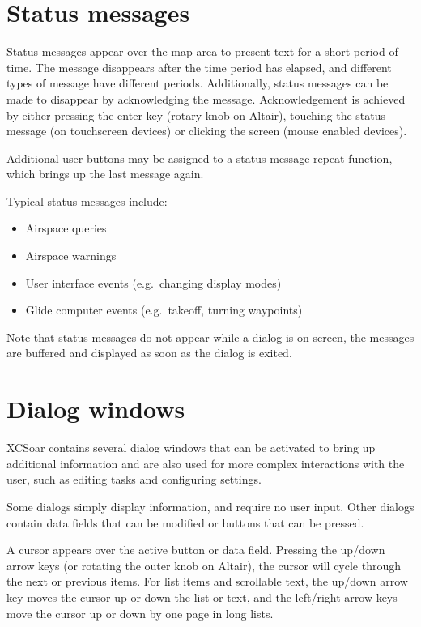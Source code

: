 \documentclass[a4paper,12pt]{refrep}
\begin{document}
\section{Status messages}
Status messages appear over the map area to present text for a short period of
time.  The message disappears after the time period has elapsed, and different
types of message have different periods. Additionally, status messages can be
made to disappear by acknowledging the message.  Acknowledgement is achieved by
either pressing the enter key (rotary knob on Altair), touching the status
message (on touchscreen devices) or clicking the screen (mouse enabled devices).

Additional user buttons may be assigned to a status message repeat function,
which brings up the last message again.

Typical status messages include:
\begin{itemize}
\item Airspace queries
\item Airspace warnings
\item User interface events (e.g.\ changing display modes)
\item Glide computer events (e.g.\ takeoff, turning waypoints)
\end{itemize}

Note that status messages do not appear while a dialog is on screen, the
messages are buffered and displayed as soon as the dialog is exited.

\section{Dialog windows}\label{sec:dialog-windows}

XCSoar contains several dialog windows that can be activated to bring up
additional information and are also used for more complex interactions with the
user, such as editing tasks and configuring settings.

Some dialogs simply display information, and require no user input. Other
dialogs contain data fields that can be modified or buttons that can be pressed.  

A cursor appears over the active button or data field. Pressing the up/down
arrow keys (or rotating the outer knob on Altair), the cursor will cycle
through the next or previous items. For list items and scrollable text, the
up/down arrow key moves the cursor up or down the list or text, and the
left/right arrow keys move the cursor up or down by one page in long lists.
\end{document}
